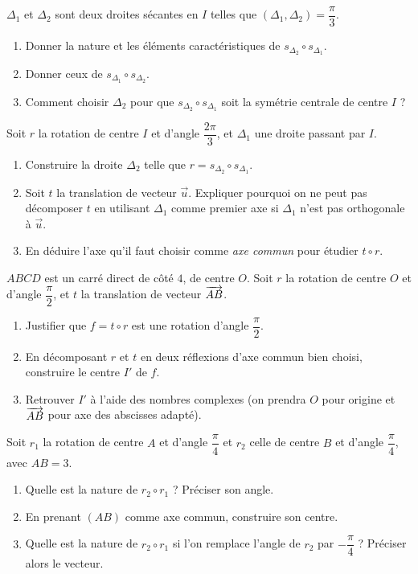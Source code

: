 $\Delta_1$ et $\Delta_2$ sont deux droites sécantes en $I$ telles que
$(\Delta_1,\Delta_2)=\dfrac{\pi}{3}$.
\begin{enumerate}
	\item Donner la nature et les éléments caractéristiques de
	$s_{\Delta_2}\circ s_{\Delta_1}$.
	\item Donner ceux de $s_{\Delta_1}\circ s_{\Delta_2}$.
	\item Comment choisir $\Delta_2$ pour que $s_{\Delta_2}\circ s_{\Delta_1}$
	soit la symétrie centrale de centre $I$ ?
\end{enumerate}

Soit $r$ la rotation de centre $I$ et d'angle $\dfrac{2\pi}{3}$, et $\Delta_1$
une droite passant par $I$.
\begin{enumerate}
	\item Construire la droite $\Delta_2$ telle que $r = s_{\Delta_2}\circ s_{\Delta_1}$.
	\item Soit $t$ la translation de vecteur $\vec u$. Expliquer pourquoi on ne
	peut pas décomposer $t$ en utilisant $\Delta_1$ comme premier axe si
	$\Delta_1$ n'est pas orthogonale à $\vec u$.
	\item En déduire l'axe qu'il faut choisir comme \emph{axe commun} pour
	étudier $t\circ r$.
\end{enumerate}

$ABCD$ est un carré direct de côté $4$, de centre $O$. Soit $r$ la rotation
de centre $O$ et d'angle $\dfrac{\pi}{2}$, et $t$ la translation de vecteur
$\overrightarrow{AB}$.
\begin{enumerate}
	\item Justifier que $f=t\circ r$ est une rotation d'angle $\dfrac{\pi}{2}$.
	\item En décomposant $r$ et $t$ en deux réflexions d'axe commun bien
	choisi, construire le centre $I'$ de $f$.
	\item Retrouver $I'$ à l'aide des nombres complexes (on prendra $O$ pour
	origine et $\overrightarrow{AB}$ pour axe des abscisses adapté).
\end{enumerate}

Soit $r_1$ la rotation de centre $A$ et d'angle $\dfrac{\pi}{4}$ et $r_2$
celle de centre $B$ et d'angle $\dfrac{\pi}{4}$, avec $AB = 3$.
\begin{enumerate}
	\item Quelle est la nature de $r_2\circ r_1$ ? Préciser son angle.
	\item En prenant $(AB)$ comme axe commun, construire son centre.
	\item Quelle est la nature de $r_2\circ r_1$ si l'on remplace l'angle de
	$r_2$ par $-\dfrac{\pi}{4}$ ? Préciser alors le vecteur.
\end{enumerate}


